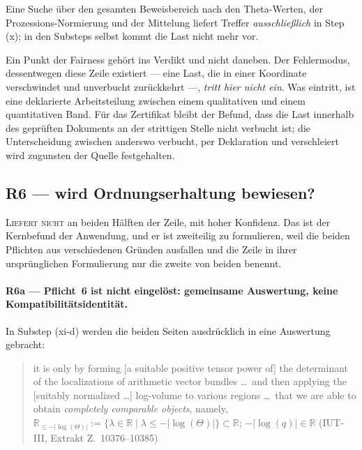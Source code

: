 \documentclass[11pt,a4paper]{article}
\theoremstyle{definition}
\newcommand{\anchor}[2]{(#1, Extrakt Z.~#2)}
\begin{document}
Eine Suche über den gesamten Beweisbereich nach den Theta-Werten, der
Prozessions-Normierung und der Mittelung liefert Treffer \emph{ausschließlich} in
Step (x); in den Substeps selbst kommt die Last nicht mehr vor.

Ein Punkt der Fairness gehört ins Verdikt und nicht daneben. Der Fehlermodus,
dessentwegen diese Zeile existiert --- eine Last, die in einer Koordinate
verschwindet und unverbucht zurückkehrt ---, \emph{tritt hier nicht ein}. Was
eintritt, ist eine deklarierte Arbeitsteilung zwischen einem qualitativen und
einem quantitativen Band. Für das Zertifikat bleibt der Befund, dass die Last
innerhalb des geprüften Dokuments an der strittigen Stelle nicht verbucht ist; die
Unterscheidung zwischen \glqq anderswo verbucht, per Deklaration\grqq{} und \glqq verschleiert\grqq
wird zugunsten der Quelle festgehalten.

\subsection{R6 --- wird Ordnungserhaltung bewiesen?}

\textsc{Liefert nicht} an beiden Hälften der Zeile, mit hoher Konfidenz. Das ist
der Kernbefund der Anwendung, und er ist zweiteilig zu formulieren, weil die
beiden Pflichten aus verschiedenen Gründen ausfallen und die Zeile in ihrer
ursprünglichen Formulierung nur die zweite von beiden benennt.

\paragraph{R6a --- Pflicht~6 ist nicht eingelöst: gemeinsame Auswertung, keine
Kompatibilitätsidentität.} In Substep (xi-d) werden die beiden Seiten
ausdrücklich in eine Auswertung gebracht:

\begin{quote}\small
\glqq it is only by forming [a suitable positive tensor power of] the determinant of
the localizations of arithmetic vector bundles \dots\ and then applying the
[suitably normalized \dots] log-volume to various regions \dots\ that we are able
to obtain \emph{completely comparable objects}, namely,
$\mathbb{R}_{\le -|\log(\Theta)|} := \{\lambda \in \mathbb{R} \mid \lambda \le
-|\log(\Theta)|\} \subset \mathbb{R}$; $-|\log(q)| \in \mathbb{R}$\grqq
\hfill\anchor{IUT-III}{10376--10385}
\end{quote}
\end{document}
